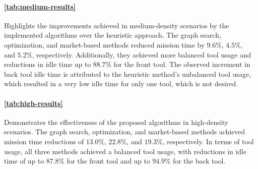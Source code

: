 \paragraph{\autoref{tab:medium-results}} Highlights the improvements achieved in medium-density scenarios by the implemented algorithms over the heuristic approach. The graph search, optimization, and market-based methods reduced mission time by $9.6\%$, $4.5\%$, and $5.2\%$, respectively. Additionally, they achieved more balanced tool usage and reductions in idle time up to $88.7\%$ for the front tool. The observed increment in back tool idle time is attributed to the heuristic method’s unbalanced tool usage, which resulted in a very low idle time for only one tool, which is not desired.

\paragraph{\autoref{tab:high-results}} Demonstrates the effectiveness of the proposed algorithms in high-density scenarios. The graph search, optimization, and market-based methods achieved mission time reductions of $13.0\%$, $22.8\%$, and $19.3\%$, respectively. In terms of tool usage, all three methods achieved a balanced tool usage, with reductions in idle time of up to $87.8\%$ for the front tool and up to $94.9\%$ for the back tool.

